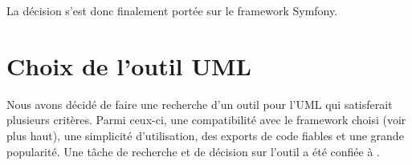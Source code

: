 \documentclass [a4paper] {article}
\begin{document}
La décision s'est donc finalement portée sur le framework Symfony.

\section{Choix de l'outil UML}
Nous avons décidé de faire une recherche d'un outil pour l'UML qui satisferait plusieurs critères. Parmi ceux-ci, une compatibilité avec le framework choisi (voir plus haut), une simplicité d'utilisation, des exports de code fiables et une grande popularité. Une tâche de recherche et de décision sur l'outil a été confiée à \Julie.


\end{document}
